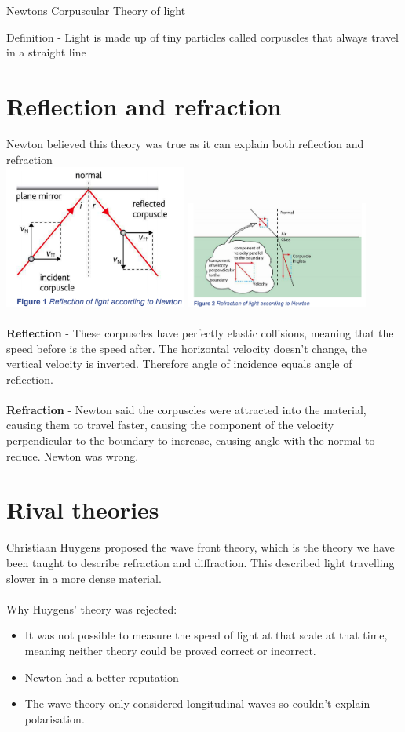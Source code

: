 \documentclass[12pt]{article}
\begin{document}
\begin{center}
\underline{\huge Newton\textquotesingle s Corpuscular Theory of light}
\end{center}
Definition - Light is made up of tiny particles called corpuscles that always travel in a straight line
\section{Reflection and refraction}
Newton believed this theory was true as it can explain both reflection and refraction\\
\includegraphics[width=6cm]{reflection.png}
\includegraphics[width=6cm]{refraction.png}\\
\\
\textbf{Reflection} - These corpuscles have perfectly elastic collisions, meaning that the speed before is the speed after. The horizontal velocity doesn't change, the vertical velocity is inverted. Therefore angle of incidence equals angle of reflection.\\
\\
\textbf{Refraction} - Newton said the corpuscles were attracted into the material, causing them to travel faster, causing the component of the velocity perpendicular to the boundary to increase, causing angle with the normal to reduce. Newton was wrong.
\section{Rival theories}
Christiaan Huygens proposed the wave front theory, which is the theory we have been taught to describe refraction and diffraction. This described light travelling slower in a more dense material.\\
\\
Why Huygens' theory was rejected:
\begin{itemize}
\item It was not possible to measure the speed of light at that scale at that time, meaning neither theory could be proved correct or incorrect.
\item Newton had a better reputation
\item The wave theory only considered longitudinal waves so couldn't explain polarisation.
\end{itemize}
\end{document}
